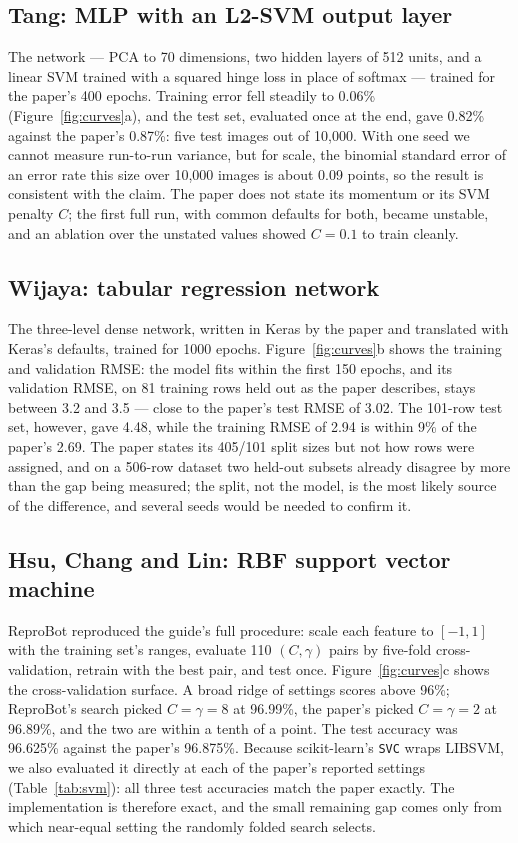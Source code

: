 \documentclass[10pt,twocolumn]{article}
\begin{document}
\subsection{Tang: MLP with an L2-SVM output layer}

The network --- PCA to 70 dimensions, two hidden layers of 512 units, and a linear SVM trained
with a squared hinge loss in place of softmax --- trained for the paper's 400 epochs. Training
error fell steadily to 0.06\% (Figure~\ref{fig:curves}a), and the test set, evaluated once at
the end, gave 0.82\% against the paper's 0.87\%: five test images out of 10{,}000. With one seed
we cannot measure run-to-run variance, but for scale, the binomial standard error of an error
rate this size over 10{,}000 images is about 0.09 points, so the result is consistent with the
claim. The paper does not state its momentum or its SVM penalty $C$; the first full run, with
common defaults for both, became unstable, and an ablation over the unstated values showed
$C = 0.1$ to train cleanly.

\subsection{Wijaya: tabular regression network}

The three-level dense network, written in Keras by the paper and translated with Keras's
defaults, trained for 1000 epochs. Figure~\ref{fig:curves}b shows the training and validation
RMSE: the model fits within the first 150 epochs, and its validation RMSE, on 81 training rows
held out as the paper describes, stays between 3.2 and 3.5 --- close to the paper's test RMSE
of 3.02. The 101-row test set, however, gave 4.48, while the training RMSE of 2.94 is within 9\%
of the paper's 2.69. The paper states its 405/101 split sizes but not how rows were assigned, and
on a 506-row dataset two held-out subsets already disagree by more than the gap being measured;
the split, not the model, is the most likely source of the difference, and several seeds would
be needed to confirm it.

\subsection{Hsu, Chang and Lin: RBF support vector machine}

ReproBot reproduced the guide's full procedure: scale each feature to $[-1, 1]$ with the
training set's ranges, evaluate 110 $(C, \gamma)$ pairs by five-fold cross-validation, retrain
with the best pair, and test once. Figure~\ref{fig:curves}c shows the cross-validation surface.
A broad ridge of settings scores above 96\%; ReproBot's search picked $C = \gamma = 8$ at
96.99\%, the paper's picked $C = \gamma = 2$ at 96.89\%, and the two are within a tenth of a
point. The test accuracy was 96.625\% against the paper's 96.875\%. Because scikit-learn's
\texttt{SVC} wraps LIBSVM, we also evaluated it directly at each of the paper's reported
settings (Table~\ref{tab:svm}): all three test accuracies match the paper exactly. The
implementation is therefore exact, and the small remaining gap comes only from which near-equal
setting the randomly folded search selects.
\end{document}
